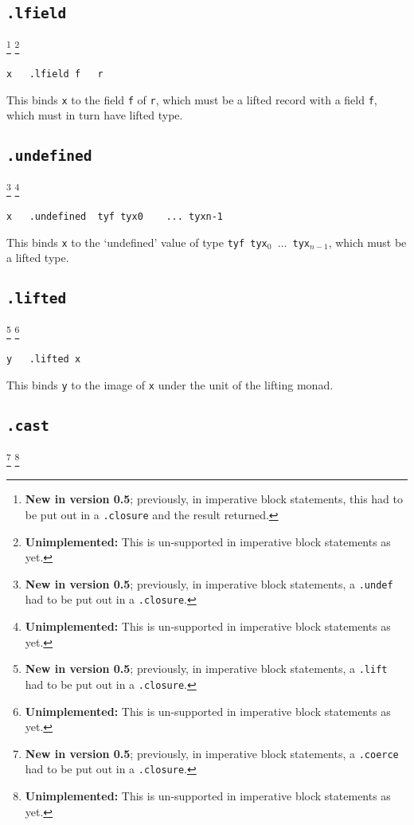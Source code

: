 \documentclass{report}
\newcommand\stringcode[1]{\texttt{#1}}
\newcommand\unimpl[1]{\footnote{\textbf{Unimplemented: }#1}}
\newcommand\new[2]{\footnote{\textbf{New in version #1}; previously, #2}}
\begin{document}
\subsection{\stringcode{.lfield}}
\new{0.5}{in imperative block statements, this had to be put out in a \stringcode{.closure} and the result returned.}
\unimpl{This is un-supported in imperative block statements as yet.}

\begin{verbatim}
x	.lfield	f	r
\end{verbatim}

This binds \stringcode{x} to the field \stringcode{f} of \stringcode{r}, which must be a lifted record with a field \stringcode{f}, which must in turn have lifted type.

\subsection{\stringcode{.undefined}}
\new{0.5}{in imperative block statements, a \stringcode{.undef} had to be put out in a \stringcode{.closure}.}
\unimpl{This is un-supported in imperative block statements as yet.}

\begin{verbatim}
x	.undefined	tyf	tyx0	...	tyxn-1
\end{verbatim}

This binds \stringcode{x} to the `undefined' value of type \stringcode{tyf tyx$_0$ $\ldots$ tyx$_{n-1}$},
which must be a lifted type.

\subsection{\stringcode{.lifted}}
\new{0.5}{in imperative block statements, a \stringcode{.lift} had to be put out in a \stringcode{.closure}.}
\unimpl{This is un-supported in imperative block statements as yet.}

\begin{verbatim}
y	.lifted	x
\end{verbatim}

This binds \stringcode{y} to the image of \stringcode{x} under the unit of the lifting monad.

\subsection{\stringcode{.cast}}
\new{0.5}{in imperative block statements, a \stringcode{.coerce} had to be put out in a \stringcode{.closure}.}
\unimpl{This is un-supported in imperative block statements as yet.}
\end{document}
